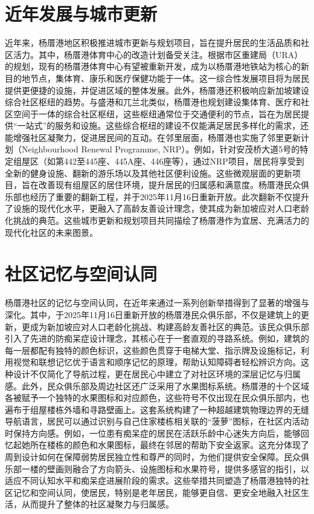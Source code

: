 \documentclass[11pt,a4paper,twoside,openany]{book}
\begin{document}
\section{近年发展与城市更新}
近年来，杨厝港地区积极推进城市更新与规划项目，旨在提升居民的生活品质和社区活力。其中，杨厝港体育中心的改造计划备受关注。根据市区重建局（URA）的规划，现有的杨厝港体育中心有望被重新开发，成为以杨厝港地铁站为核心的新目的地节点，集体育、康乐和医疗保健功能于一体。这一综合性发展项目将为居民提供更便捷的设施，并促进区域的整体发展。此外，杨厝港还积极响应新加坡建设综合社区枢纽的趋势。与盛港和兀兰北类似，杨厝港也规划建设集体育、医疗和社区空间于一体的综合社区枢纽，这些枢纽通常位于交通便利的节点，旨在为居民提供“一站式”的服务和设施。这些综合枢纽的建设不仅能满足居民多样化的需求，还能增强社区凝聚力，促进居民间的互动。在邻里层面，杨厝港也实施了邻里更新计划（Neighbourhood Renewal Programme, NRP）。例如，针对安茂桥大道5号的特定组屋区（如第442至445座、445A座、446座等），通过NRP项目，居民将享受到全新的健身设施、翻新的游乐场以及其他社区便利设施。这些微观层面的更新项目，旨在改善现有组屋区的居住环境，提升居民的归属感和满意度。杨厝港民众俱乐部也经历了重要的翻新工程，并于2025年11月16日重新开放。此次翻新不仅提升了设施的现代化水平，更融入了高龄友善设计理念，使其成为新加坡应对人口老龄化挑战的典范。这些城市更新和规划项目共同描绘了杨厝港作为宜居、充满活力的现代化社区的未来图景。

\section{社区记忆与空间认同}
杨厝港社区的记忆与空间认同，在近年来通过一系列创新举措得到了显著的增强与深化。其中，于2025年11月16日重新开放的杨厝港民众俱乐部，不仅是建筑上的更新，更成为新加坡应对人口老龄化挑战、构建高龄友善社区的典范。该民众俱乐部引入了先进的防痴呆症设计理念，其核心在于一套直观的寻路系统。例如，建筑的每一层都配有独特的颜色标识，这些颜色贯穿于电梯大堂、指示牌及设施标记，利用视觉和联想记忆优于语言和顺序记忆的原理，帮助认知障碍者轻松辨识方向。这种设计不仅简化了导航过程，更在居民心中建立了对社区环境的深层记忆与归属感。此外，民众俱乐部及周边社区还广泛采用了水果图标系统。杨厝港的十个区域各被赋予一个独特的水果图标和对应颜色，这些符号不仅出现在民众俱乐部内，也遍布于组屋楼栋外墙和寻路壁画上。这套系统构建了一种超越建筑物理边界的无缝导航语言，居民可以通过识别与自己住家楼栋相关联的“菠萝”图标，在社区内活动时保持方向感。例如，一位患有痴呆症的居民在活跃乐龄中心迷失方向后，能够回忆起她所在楼栋的颜色和水果图标，最终在邻居的帮助下安全返家。这充分体现了周到设计如何在保障弱势居民独立性和尊严的同时，为他们提供安全保障。民众俱乐部一楼的壁画则融合了方向箭头、设施图标和水果符号，提供多感官的指引，以适应不同认知水平和痴呆症进展阶段的需求。这些举措共同塑造了杨厝港独特的社区记忆和空间认同，使居民，特别是老年居民，能够更自信、更安全地融入社区生活，从而提升了整体的社区凝聚力与归属感。
\end{document}
